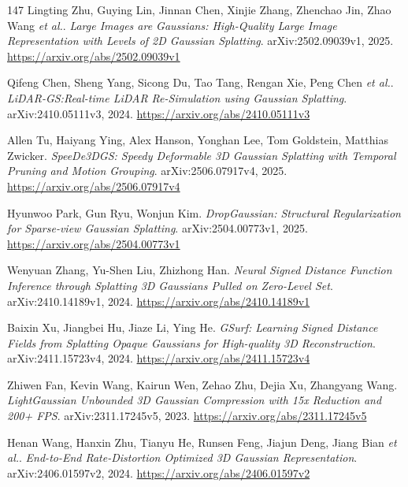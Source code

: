 \documentclass[11pt,a4paper]{article}
\begin{document}
\begin{thebibliography}{147}
Lingting Zhu, Guying Lin, Jinnan Chen, Xinjie Zhang, Zhenchao Jin, Zhao Wang \emph{et al.}.
\newblock \emph{Large Images are Gaussians: High-Quality Large Image Representation with Levels of 2D Gaussian Splatting}.
\newblock arXiv:2502.09039v1, 2025.
\newblock \url{https://arxiv.org/abs/2502.09039v1}

Qifeng Chen, Sheng Yang, Sicong Du, Tao Tang, Rengan Xie, Peng Chen \emph{et al.}.
\newblock \emph{LiDAR-GS:Real-time LiDAR Re-Simulation using Gaussian Splatting}.
\newblock arXiv:2410.05111v3, 2024.
\newblock \url{https://arxiv.org/abs/2410.05111v3}

Allen Tu, Haiyang Ying, Alex Hanson, Yonghan Lee, Tom Goldstein, Matthias Zwicker.
\newblock \emph{SpeeDe3DGS: Speedy Deformable 3D Gaussian Splatting with Temporal Pruning and Motion Grouping}.
\newblock arXiv:2506.07917v4, 2025.
\newblock \url{https://arxiv.org/abs/2506.07917v4}

Hyunwoo Park, Gun Ryu, Wonjun Kim.
\newblock \emph{DropGaussian: Structural Regularization for Sparse-view Gaussian Splatting}.
\newblock arXiv:2504.00773v1, 2025.
\newblock \url{https://arxiv.org/abs/2504.00773v1}

Wenyuan Zhang, Yu-Shen Liu, Zhizhong Han.
\newblock \emph{Neural Signed Distance Function Inference through Splatting 3D Gaussians Pulled on Zero-Level Set}.
\newblock arXiv:2410.14189v1, 2024.
\newblock \url{https://arxiv.org/abs/2410.14189v1}

Baixin Xu, Jiangbei Hu, Jiaze Li, Ying He.
\newblock \emph{GSurf: Learning Signed Distance Fields from Splatting Opaque Gaussians for High-quality 3D Reconstruction}.
\newblock arXiv:2411.15723v4, 2024.
\newblock \url{https://arxiv.org/abs/2411.15723v4}

Zhiwen Fan, Kevin Wang, Kairun Wen, Zehao Zhu, Dejia Xu, Zhangyang Wang.
\newblock \emph{LightGaussian Unbounded 3D Gaussian Compression with 15x Reduction and 200+ FPS}.
\newblock arXiv:2311.17245v5, 2023.
\newblock \url{https://arxiv.org/abs/2311.17245v5}

Henan Wang, Hanxin Zhu, Tianyu He, Runsen Feng, Jiajun Deng, Jiang Bian \emph{et al.}.
\newblock \emph{End-to-End Rate-Distortion Optimized 3D Gaussian Representation}.
\newblock arXiv:2406.01597v2, 2024.
\newblock \url{https://arxiv.org/abs/2406.01597v2}


\end{thebibliography}
\end{document}
